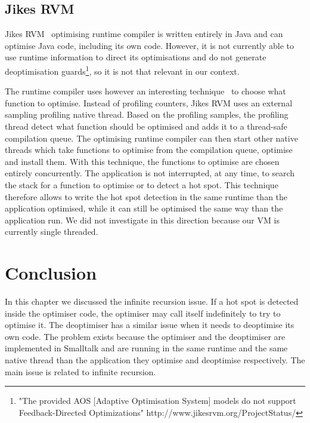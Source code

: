 \documentclass[a4paper,12pt,twoside]{../includes/ThesisStyle}
\begin{document}
\subsection{Jikes RVM}

Jikes RVM~\cite{Alp99a,Arn00} optimising runtime compiler is written entirely in Java and can optimise Java code, including its own code. However, it is not currently able to use runtime information to direct its optimisations and do not generate deoptimisation guards\footnote{"The provided AOS [Adaptive Optimisation System] models do not support Feedback-Directed Optimizations" http://www.jikesrvm.org/ProjectStatus/}, so it is not that relevant in our context. 

The runtime compiler uses however an interesting technique~\cite{Arn00} to choose what function to optimise. Instead of profiling counters, Jikes RVM uses an external sampling profiling native thread. Based on the profiling samples, the profiling thread detect what function should be optimised and adds it to a thread-safe compilation queue. The optimising runtime compiler can then start other native threads which take functions to optimise from the compilation queue, optimise and install them. With this technique, the functions to optimise are chosen entirely concurrently. The application is not interrupted, at any time, to search the stack for a function to optimise or to detect a hot spot. This technique therefore allows to write the hot spot detection in the same runtime than the application optimised, while it can still be optimised the same way than the application run. We did not investigate in this direction because our VM is currently single threaded.


\section*{Conclusion}

In this chapter we discussed the infinite recursion issue. If a hot spot is detected inside the optimiser code, the optimiser may call itself indefinitely to try to optimise it. The deoptimiser has a similar issue when it needs to deoptimise its own code. The problem exists because the optimiser and the deoptimiser are implemented in Smalltalk and are running in the same runtime and the same native thread than the application they optimise and deoptimise respectively. The main issue is related to infinite recursion.
\end{document}
